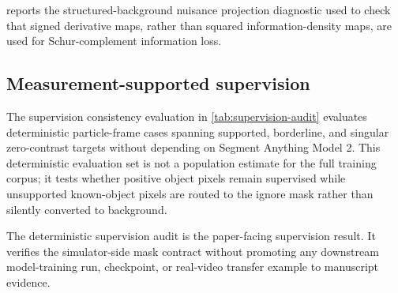  reports the structured-background nuisance projection diagnostic used to check that signed derivative maps, rather than squared information-density maps, are used for Schur-complement information loss.


\subsection{Measurement-supported supervision}

The supervision consistency evaluation in \cref{tab:supervision-audit} evaluates deterministic particle-frame cases spanning supported, borderline, and singular zero-contrast targets without depending on Segment Anything Model 2. This deterministic evaluation set is not a population estimate for the full training corpus; it tests whether positive object pixels remain supervised while unsupported known-object pixels are routed to the ignore mask rather than silently converted to background.


The deterministic supervision audit is the paper-facing supervision result. It verifies the simulator-side mask contract without promoting any downstream model-training run, checkpoint, or real-video transfer example to manuscript evidence.
